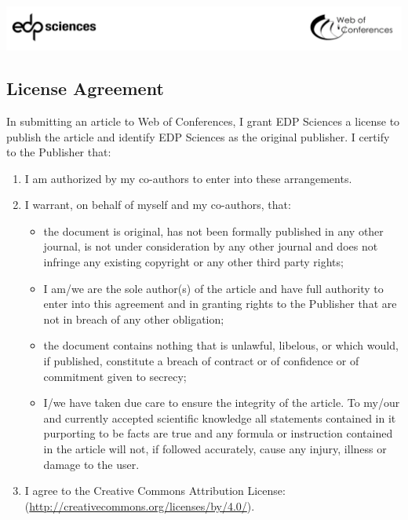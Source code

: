 \documentclass[a4paper,10pt]{article}
\begin{document}
\sffamily
\small
\raggedright

\begin{center}
    \includegraphics[width=\linewidth]{figures/edp-logos.png}
\end{center}

\subsection*{License Agreement}

In submitting an article to Web of Conferences, I grant EDP Sciences a license to publish the article and identify EDP Sciences as the original publisher. I certify to the Publisher that:

\begin{enumerate}
    \item I am authorized by my co-authors to enter into these arrangements.
    \item I warrant, on behalf of myself and my co-authors, that:
    \begin{itemize}
        \item the document is original, has not been formally published in any other journal, is not under consideration by any other journal and does not infringe any existing copyright or any other third party rights;
        \item I am/we are the sole author(s) of the article and have full authority to enter into this agreement and in granting rights to the Publisher that are not in breach of any other obligation;
        \item the document contains nothing that is unlawful, libelous, or which would, if published, constitute a breach of contract or of confidence or of commitment given to secrecy;
        \item I/we have taken due care to ensure the integrity of the article. To my/our and currently accepted scientific knowledge all statements contained in it purporting to be facts are true and any formula or instruction contained in the article will not, if followed accurately, cause any injury, illness or damage to the user.
    \end{itemize}
    \item I agree to the Creative Commons Attribution License:\linebreak (\url{http://creativecommons.org/licenses/by/4.0/}).
\end{enumerate}
\end{document}
